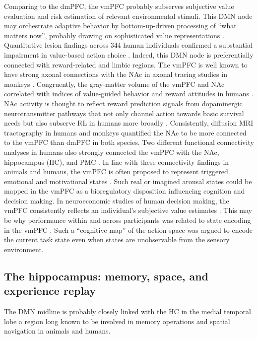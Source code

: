 \documentclass[10pt,letterpaper]{article}
\begin{document}
Comparing to the dmPFC,
the vmPFC probably subserves
subjective value evaluation and
risk estimation of relevant environmental stimuli.
This DMN node may
orchestrate adaptive behavior by bottom-up-driven
processing of “what matters now”,
probably drawing on sophisticated value representations
\citep{doherty2015structure}.
Quantitative lesion findings across 344 human individuals confirmed
a substantial impairment in value-based action choice
\citep{glascher2012lesion}.
Indeed,
this DMN node is preferentially connected with reward-related and limbic regions.
The vmPFC is well known to have strong axonal connections
with the NAc
in axonal tracing studies in monkeys \citep{haber1995orbital}.
Congruently, the gray-matter volume of the vmPFC and NAc
correlated with indices of value-guided behavior and reward attitudes
in humans
\citep{lebreton2009automatic}.
NAc activity is thought to reflect reward prediction signals
from dopaminergic neurotransmitter pathways
\citep{schultz1998predictive}
that not only channel action towards basic survival needs but also
subserve RL in humans more broadly \citep{doherty2015structure}.
Consistently, diffusion MRI tractography in humans and monkeys
\citep{croxson2005quantitative}
quantified the NAc to
be more connected to the vmPFC than dmPFC in both species.
Two different functional connectivity analyses in humans also strongly connected
the vmPFC with the NAc, hippocampus (HC),
and PMC \citep{bzdok2015subspecialization}.
%
In line with these connectivity findings in animals and humans,
the vmPFC is often proposed to represent triggered
emotional and motivational states \citep{damasio1996somatic}.
Such real or imagined arousal states could be mapped in the vmPFC
as a bioregulatory disposition influencing cognition
and decision making.
In neuroeconomic studies of human decision making,
the vmPFC consistently reflects an individual’s subjective
value estimates
\citep{behrens2008associative}.
This may be why performance within and across participants
was related to state encoding in the vmPFC \citep{Schuck2016}.
Such a ``cognitive map'' of the action space was argued to encode
the current task state even when states are unobservable from the sensory environment.



\subsection{The hippocampus: memory, space, and experience replay}
The DMN midline is probably closely linked
with the HC in the medial temporal lobe \citep{vincet2006, shannon2013morning} \textemdash
a region long known to be involved in
memory operations and spatial navigation in animals and humans.
\end{document}
